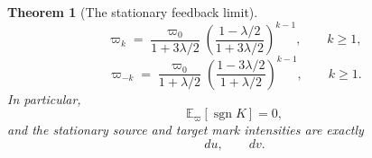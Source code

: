 \documentclass[11pt,reqno]{amsart}
\newtheorem{theorem}{Theorem}[section]
\theoremstyle{definition}
\theoremstyle{remark}
\numberwithin{equation}{section}
\newcommand{\E}{\mathbb E}
\newcommand{\sgn}{\operatorname{sgn}}
\begin{document}
\begin{theorem}[The stationary feedback limit]
\begin{equation}
\label{eq:3.5}
\end{equation}
\begin{equation}
\varpi_k=
\frac{\varpi_0}{1+3\lambda/2}
\left(\frac{1-\lambda/2}{1+3\lambda/2}\right)^{k-1},
\qquad k\ge1,
\label{eq:3.6}
\end{equation}
\begin{equation}
\varpi_{-k}=
\frac{\varpi_0}{1+\lambda/2}
\left(\frac{1-3\lambda/2}{1+\lambda/2}\right)^{k-1},
\qquad k\ge1.
\label{eq:3.7}
\end{equation}
In particular,
\begin{equation}
\E_\varpi[\sgn K]=0,
\label{eq:3.8}
\end{equation}
and the stationary source and target mark intensities are exactly
\begin{equation}
du,\qquad dv.
\label{eq:3.9}
\end{equation}
\end{theorem}
\end{document}
